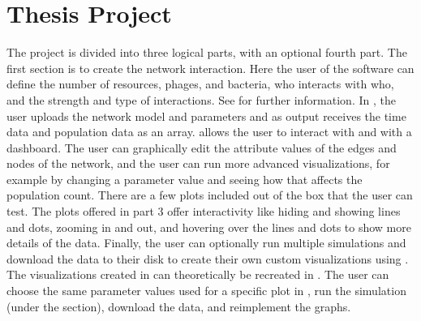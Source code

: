 \section{Thesis Project}
The project is divided into three logical parts, with an optional fourth part.
The first section is to create the network interaction. 
Here the user of the software can define the number of resources, phages, and bacteria, who interacts with who, and the strength and type of interactions. See  for further information. \newline
In , the user uploads the network model and parameters and as output receives the time data and population data as an array. \newline
{} allows the user to interact with  and  with a dashboard. 
The user can graphically edit the attribute values of the edges and nodes of the network, and the user can run more advanced visualizations, for example by changing a parameter value and seeing how that affects the population count. 
There are a few plots included out of the box that the user can test. 
The plots offered in part 3 offer interactivity like hiding and showing lines and dots, zooming in and out, and hovering over the lines and dots to show more details of the data. 
\newline
Finally, the user can optionally run multiple simulations and download the data to their disk to create their own custom visualizations using . 
The visualizations created in  can theoretically be recreated in . 
The user can choose the same parameter values used for a specific plot in , run the simulation (under the  section), download the data, and reimplement the graphs. 